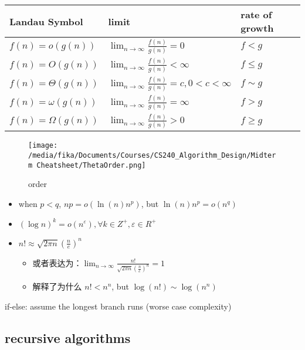 \documentclass[]{article}
\date{}
\begin{document}
\begin{longtable}[]{@{}lll@{}}
\toprule
Landau Symbol & limit & rate of growth\tabularnewline
\midrule
\endhead
\(f(n)=o(g(n))\) & \(\lim_{n \rightarrow \infty}\frac{f(n)}{g(n)} = 0\)
& \(f  < g\)\tabularnewline
\(f(n)=O(g(n))\) &
\(\lim_{n \rightarrow \infty}\frac{f(n)}{g(n)} < \infty\) &
\(f \le g\)\tabularnewline
\(f(n)=\Theta(g(n))\) &
\(\lim_{n \rightarrow \infty}\frac{f(n)}{g(n)}=c,0<c < \infty\) &
\(f \sim g\)\tabularnewline
\(f(n)=\omega(g(n))\) &
\(\lim_{n \rightarrow \infty}\frac{f(n)}{g(n)} = \infty\) &
\(f>g\)\tabularnewline
\(f(n)=\Omega(g(n))\) &
\(\lim_{n \rightarrow \infty}\frac{f(n)}{g(n)} > 0\) &
\(f \ge g\)\tabularnewline
\bottomrule
\end{longtable}

\begin{figure}
\centering
\texttt{[image: /media/fika/Documents/Courses/CS240\_Algorithm\_Design/Midterm Cheatsheet/ThetaOrder.png]}
\caption{order}
\end{figure}

\begin{itemize}
\item
  when \(p<q\), \(np = o(\ln(n)n^p)\), but \(\ln(n)n^p = o(n^q)\)
\item
  \((\log n)^k = o(n^ε), ∀k ∈ Z^+, ε ∈ R^+\) 
\item
  \(n! \approx \sqrt{2\pi n}(\frac{n}{e})^n\)

  \begin{itemize}
  \item
    或者表达为：\( \lim_{n\rightarrow \infty} \frac{n!}{\sqrt{2\pi n}(\frac{n}{e})^n}=1\)
  \item
    解释了为什么 \(n!<n^n\), but \(\log(n!)\sim\log(n^n)\)
  \end{itemize}
\end{itemize}

if-else: assume the longest branch runs (worse case complexity)

\hypertarget{recursive-algorithms}{%
\subsection{recursive algorithms}\label{recursive-algorithms}}
\end{document}

